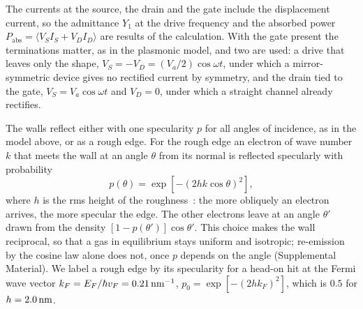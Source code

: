 The currents at the source, the drain and the gate include the
displacement current, so the admittance $Y_{1}$ at the drive frequency and
the absorbed power $P_{\mathrm{abs}}=\langle V_{S}I_{S}+V_{D}I_{D}\rangle$
are results of the calculation. With the gate present the terminations
matter, as in the plasmonic model, and two are used: a drive that leaves
only the shape, $V_{S}=-V_{D}=(V_{a}/2)\cos\omega t$, under which a
mirror-symmetric device gives no rectified current by symmetry, and the
drain tied to the gate, $V_{S}=V_{a}\cos\omega t$ and $V_{D}=0$, under
which a straight channel already rectifies.

The walls reflect either with one specularity $p$ for all angles of
incidence, as in the model above, or as a rough edge. For the rough edge
an electron of wave number $k$ that meets the wall at an angle $\theta$
from its normal is reflected specularly with probability
\begin{equation}
p(\theta)=\exp\left[-(2hk\cos\theta)^{2}\right],
\label{eq:rough}
\end{equation}
where $h$ is the rms height of the
roughness~\cite{soffer1967statistical,shao2017probing}: the more obliquely
an electron arrives, the more specular the edge. The other electrons
leave at an angle $\theta'$ drawn from the density
$[1-p(\theta')]\cos\theta'$. This choice makes the wall reciprocal, so
that a gas in equilibrium stays uniform and isotropic; re-emission by the
cosine law alone does not, once $p$ depends on the angle (Supplemental
Material). We label a rough edge by its specularity for a head-on hit at
the Fermi wave vector $k_{F}=E_{F}/\hbar v_{F}=0.21\,\mathrm{nm}^{-1}$,
$p_{0}=\exp[-(2hk_{F})^{2}]$, which is $0.5$ for $h=2.0\,\mathrm{nm}$.


